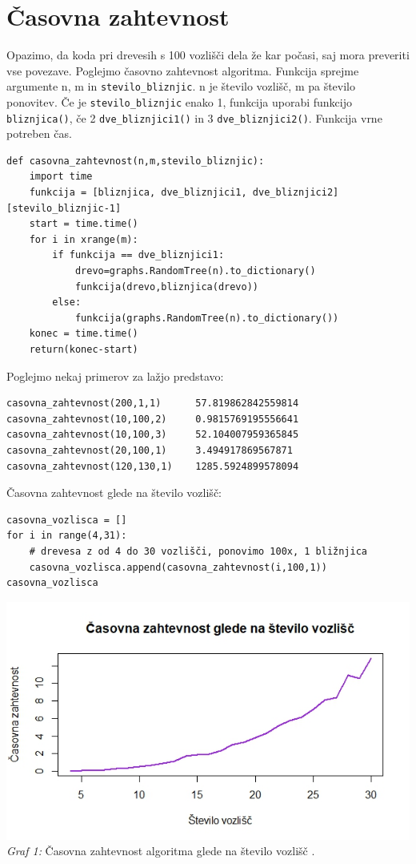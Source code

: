 \documentclass[a4paper,10pt]{article}
\begin{document}
{\begin{tabular}{ |p{3cm}||p{3cm}|p{3cm}|p{3cm}|  }
 \hline
\end{tabular}

\section{Časovna zahtevnost}
Opazimo, da koda pri drevesih s 100 vozlišči dela že kar počasi, saj mora preveriti vse povezave. Poglejmo časovno zahtevnost algoritma. Funkcija sprejme argumente n, m in \texttt{stevilo\_bliznjic}. n je število vozlišč, m pa število ponovitev. Če je \texttt{stevilo\_bliznjic} enako 1, funkcija uporabi funkcijo \texttt{bliznjica()}, če 2 \texttt{dve\_bliznjici1()} in 3 \texttt{dve\_bliznjici2()}. Funkcija vrne potreben čas.
\begin{verbatim}
def casovna_zahtevnost(n,m,stevilo_bliznjic):
    import time
    funkcija = [bliznjica, dve_bliznjici1, dve_bliznjici2][stevilo_bliznjic-1]
    start = time.time()
    for i in xrange(m):
        if funkcija == dve_bliznjici1:
            drevo=graphs.RandomTree(n).to_dictionary()
            funkcija(drevo,bliznjica(drevo))
        else:
            funkcija(graphs.RandomTree(n).to_dictionary())
    konec = time.time()
    return(konec-start)
\end{verbatim}
Poglejmo nekaj primerov za lažjo predstavo:
\begin{verbatim}
casovna_zahtevnost(200,1,1)      57.819862842559814
casovna_zahtevnost(10,100,2)     0.9815769195556641
casovna_zahtevnost(10,100,3)     52.104007959365845
casovna_zahtevnost(20,100,1)     3.494917869567871
casovna_zahtevnost(120,130,1)    1285.5924899578094
\end{verbatim}
Časovna zahtevnost glede na število vozlišč:
\begin{verbatim}
casovna_vozlisca = []
for i in range(4,31):
    # drevesa z od 4 do 30 vozlišči, ponovimo 100x, 1 bližnjica
    casovna_vozlisca.append(casovna_zahtevnost(i,100,1)) 
casovna_vozlisca
\end{verbatim}
\begin{center}
\includegraphics[scale = 0.8]{casovna}\\ 
\scriptsize{\textit{Graf 1: } Časovna zahtevnost algoritma glede na število vozlišč .}
\end{center}
}
\end{document}
